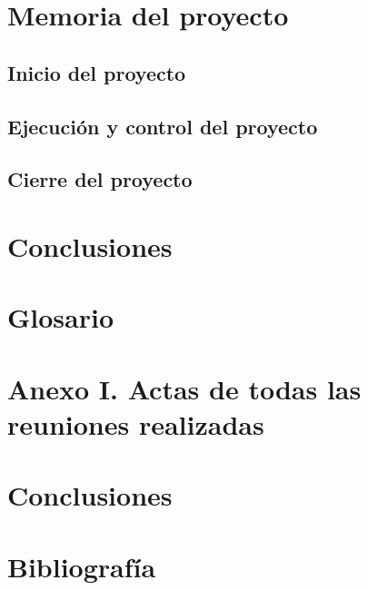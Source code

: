 \documentclass{article}
\begin{document}








\section{Memoria del proyecto}

\subsection{Inicio del proyecto}

\subsection{Ejecución y control del proyecto}

\subsection{Cierre del proyecto}

\section{Conclusiones}

\section*{Glosario}

\section*{Anexo I. Actas de todas las reuniones realizadas}

\section{Conclusiones}

\section{Bibliografía}
\end{document}
